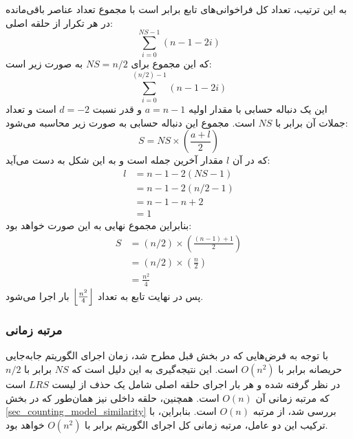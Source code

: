 به این ترتیب، تعداد کل فراخوانی‌های تابع
برابر است با مجموع تعداد عناصر باقی‌مانده در هر تکرار از حلقه اصلی:
\begin{equation}
	\sum_{i=0}^{NS-1} (n-1-2i)
\end{equation}
که این مجموع برای \( NS=n/2 \) به صورت زیر است:
\begin{equation}
	\sum_{i=0}^{(n/2)-1} (n-1-2i)
\end{equation}
این یک دنباله حسابی با مقدار اولیه \(a=n-1\) و قدر نسبت
 \(d=-2\) 
است و تعداد جملات آن برابر با \( NS \) است.
مجموع این دنباله حسابی به صورت زیر محاسبه می‌شود:
\begin{equation}
	S = NS \times \left( \frac{a+l}{2} \right)
\end{equation}
که در آن \( l \) مقدار آخرین جمله است و به این شکل به دست می‌آید:
\begin{equation}
	\begin{align*} 
		l &= n-1-2(NS-1) \\
		  &= n-1-2(n/2-1) \\
		  &= n-1-n+2 \\
		  &= 1
	\end{align*}
\end{equation}
بنابراین مجموع نهایی به این صورت خواهد بود:
\begin{equation}
	\begin{align*} 
		S &= (n/2) \times \left( \frac{(n-1)+1}{2} \right) \\
		&= (n/2) \times \left( \frac{n}{2} \right) \\
		&= \frac{n^2}{4}
	\end{align*}
\end{equation}
پس در نهایت تابع
به تعداد
\(
\left \lfloor \frac{n^2}{4} \right \rfloor
 \) 
بار اجرا می‌شود.

\vspace{3mm}
\subsubsection{مرتبه زمانی}\vspace{-1mm}
با توجه به فرض‌هایی که در بخش قبل مطرح شد، زمان اجرای الگوریتم جابه‌جایی حریصانه برابر با \( O(n^2) \) است. این نتیجه‌گیری به این دلیل است که \( NS \) برابر با \( n/2 \) در نظر گرفته شده و هر بار اجرای حلقه اصلی شامل یک حذف از لیست \( LRS \) است که مرتبه زمانی آن \( O(n) \) است. همچنین، حلقه داخلی نیز همان‌طور که در بخش
\ref{sec_counting_model_similarity}
بررسی شد، از مرتبه \( O(n) \) است. بنابراین، با ترکیب این دو عامل، مرتبه زمانی کل اجرای الگوریتم برابر با \( O(n^2) \) خواهد بود.

